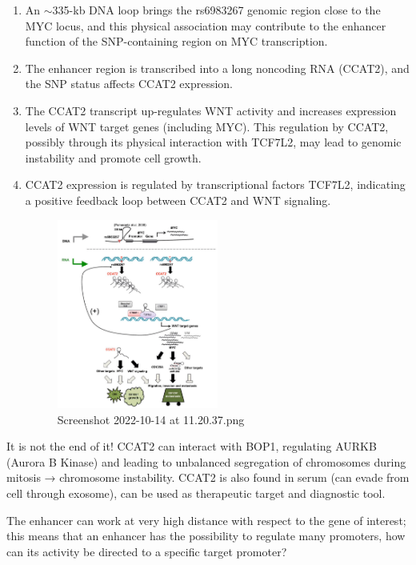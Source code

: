 \begin{enumerate}
\def\labelenumi{\arabic{enumi}.}
\item
  An $\sim$335-kb DNA loop brings the rs6983267 genomic region close to the MYC locus, and this physical association may contribute to the enhancer function of the SNP-containing region on MYC transcription.
\item
  The enhancer region is transcribed into a long noncoding RNA (CCAT2), and the SNP status affects CCAT2 expression.
\item
  The CCAT2 transcript up-regulates WNT activity and increases expression levels of WNT target genes (including MYC). This regulation by CCAT2, possibly through its physical interaction with TCF7L2, may lead to genomic instability and promote cell growth.
\item
  CCAT2 expression is regulated by transcriptional factors TCF7L2, indicating a positive feedback loop between CCAT2 and WNT signaling.

  \begin{figure}
  \centering
  \includegraphics[width=0.5\textwidth]{../_resources/Screenshot_2022-10-14_at_11-20-37.png}
  \caption{Screenshot 2022-10-14 at 11.20.37.png}
  \end{figure}
\end{enumerate}

It is not the end of it! CCAT2 can interact with BOP1, regulating AURKB (Aurora B Kinase) and leading to unbalanced segregation of chromosomes during mitosis → chromosome instability. CCAT2 is also found in serum (can evade from cell through exosome), can be used as therapeutic target and diagnostic tool.

The enhancer can work at very high distance with respect to the gene of interest; this means that an enhancer has the possibility to regulate many promoters, how can its activity be directed to a specific target promoter?

